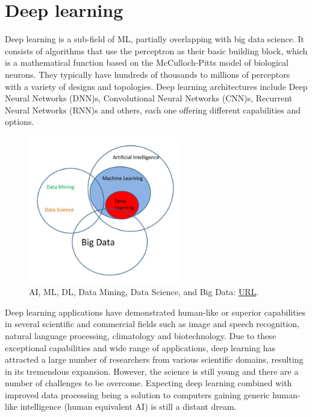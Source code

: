 \section{Deep learning}
Deep learning is a sub-field of ML, partially overlapping with big data science. It consists of algorithms that use the perceptron as their basic building block, which is a mathematical function based on the McCulloch-Pitts model of biological neurons. They typically have hundreds of thousands to millions of perceptors with a variety of designs and topologies. Deep learning architectures include Deep Neural Networks (DNN)s, Convolutional Neural Networks (CNN)s, Recurrent Neural Networks (RNN)s and others, each one offering different capabilities and options.
\begin{figure}[H]
    \centering
        \includegraphics[width=0.6\textwidth]{Images/diagrams/ai_data_science.jpg}
        \decoRule
        \caption[AI Venn Diagram]{AI, ML, DL, Data Mining, Data Science, and Big Data: \href{https://whatsthebigdata.com/2016/10/17/visually-linking-ai-machine-learning-deep-learning-big-data-and-data-science/}{URL}.}
        \label{fig:AI Venn Diagram}
\end{figure}

Deep learning applications have demonstrated human-like or superior capabilities in several scientific and commercial fields such as image\cite{Alexnet} and speech\cite{limits_speech_recognition} recognition, natural language processing\cite{natural_language}, climatology\cite{Climatology} and biotechnology\cite{biotechnology}. Due to these exceptional capabilities and wide range of applications, deep learning has attracted a large number of researchers from various scientific domains, resulting in its tremendous expansion. However, the science is still young and there are a number of challenges to be overcome. Expecting deep learning combined with improved data processing being a solution to computers gaining generic human-like intelligence (human equivalent AI) is still a distant dream.\cite{dl_evolution}

